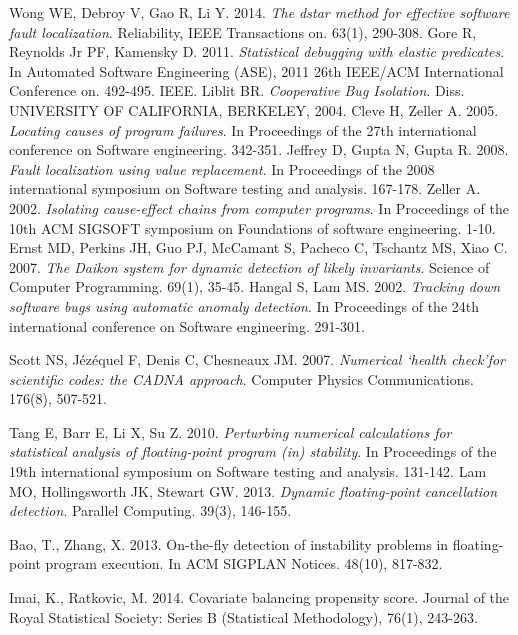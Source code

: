 \documentclass[times]{stvrauth}
\begin{document}
\begin{thebibliography}{9}
 Wong WE, Debroy V, Gao R, Li Y. 2014. {\it The dstar method for effective software fault localization}. Reliability, IEEE Transactions on. 63(1), 290-308.
 Gore R, Reynolds Jr PF, Kamensky D. 2011. {\it Statistical debugging with elastic predicates}. In Automated Software Engineering (ASE), 2011 26th IEEE/ACM International Conference on. 492-495. IEEE.
Liblit BR. {\it Cooperative Bug Isolation}. Diss. UNIVERSITY OF CALIFORNIA, BERKELEY, 2004.
 Cleve H, Zeller A. 2005. {\it Locating causes of program failures}. In Proceedings of the 27th international conference on Software engineering. 342-351.
 Jeffrey D, Gupta N, Gupta R. 2008. {\it Fault localization using value replacement}. In Proceedings of the 2008 international symposium on Software testing and analysis. 167-178.
 Zeller A. 2002. {\it Isolating cause-effect chains from computer programs}. In Proceedings of the 10th ACM SIGSOFT symposium on Foundations of software engineering. 1-10.
Ernst MD, Perkins JH, Guo PJ, McCamant S, Pacheco C, Tschantz MS, Xiao C. 2007. {\it The Daikon system for dynamic detection of likely invariants}. Science of Computer Programming. 69(1), 35-45.
 Hangal S, Lam MS. 2002. {\it Tracking down software bugs using automatic anomaly detection}. In Proceedings of the 24th international conference on Software engineering. 291-301.

 Scott NS, J{\'e}z{\'e}quel F, Denis C, Chesneaux JM. 2007. {\it Numerical ‘health check’for scientific codes: the CADNA approach}. Computer Physics Communications. 176(8), 507-521.

 Tang E, Barr E, Li X, Su Z. 2010. {\it Perturbing numerical calculations for statistical analysis of floating-point program (in) stability}. In Proceedings of the 19th international symposium on Software testing and analysis. 131-142.
 Lam MO, Hollingsworth JK, Stewart GW. 2013. {\it Dynamic floating-point cancellation detection}. Parallel Computing. 39(3), 146-155.

 Bao, T., Zhang, X. 2013. On-the-fly detection of instability problems in floating-point program execution. In ACM SIGPLAN Notices. 48(10), 817-832.

 Imai, K., Ratkovic, M. 2014. Covariate balancing propensity score. Journal of the Royal Statistical Society: Series B (Statistical Methodology), 76(1), 243-263.


\end{thebibliography}
\end{document}
